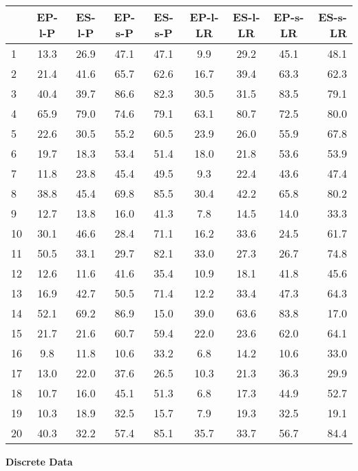 \documentclass[]{svjour3}
\begin{document}
\begin{table}[H]
\begin{center}
\begin{tabular}{l|c|c|c|c|c|c|c|r}
 & EP-l-P & ES-l-P & EP-s-P & ES-s-P & EP-l-LR & ES-l-LR & EP-s-LR & ES-s-LR \\
\hline
1 & 13.3 & 26.9 & 47.1 & 47.1 & 9.9 & 29.2 & 45.1 & 48.1 \\
2 & 21.4 & 41.6 & 65.7 & 62.6 & 16.7 & 39.4 & 63.3 & 62.3 \\
3 & 40.4 & 39.7 & 86.6 & 82.3 & 30.5 & 31.5 & 83.5 & 79.1 \\
4 & 65.9 & 79.0 & 74.6 & 79.1 & 63.1 & 80.7 & 72.5 & 80.0 \\
5 & 22.6 & 30.5 & 55.2 & 60.5 & 23.9 & 26.0 & 55.9 & 67.8 \\
6 & 19.7 & 18.3 & 53.4 & 51.4 & 18.0 & 21.8 & 53.6 & 53.9 \\
7 & 11.8 & 23.8 & 45.4 & 49.5 & 9.3 & 22.4 & 43.6 & 47.4 \\
8 & 38.8 & 45.4 & 69.8 & 85.5 & 30.4 & 42.2 & 65.8 & 80.2 \\
9 & 12.7 & 13.8 & 16.0 & 41.3 & 7.8 & 14.5 & 14.0 & 33.3 \\
10 & 30.1 & 46.6 & 28.4 & 71.1 & 16.2 & 33.6 & 24.5 & 61.7 \\
11 & 50.5 & 33.1 & 29.7 & 82.1 & 33.0 & 27.3 & 26.7 & 74.8 \\
12 & 12.6 & 11.6 & 41.6 & 35.4 & 10.9 & 18.1 & 41.8 & 45.6 \\
13 & 16.9 & 42.7 & 50.5 & 71.4 & 12.2 & 33.4 & 47.3 & 64.3 \\
14 & 52.1 & 69.2 & 86.9 & 15.0 & 39.0 & 63.6 & 83.8 & 17.0 \\
15 & 21.7 & 21.6 & 60.7 & 59.4 & 22.0 & 23.6 & 62.0 & 64.1 \\
16 & 9.8 & 11.8 & 10.6 & 33.2 & 6.8 & 14.2 & 10.6 & 33.0 \\
17 & 13.0 & 22.0 & 37.6 & 26.5 & 10.3 & 21.3 & 36.3 & 29.9 \\
18 & 10.7 & 16.0 & 45.1 & 51.3 & 6.8 & 17.3 & 44.9 & 52.7 \\
19 & 10.3 & 18.9 & 32.5 & 15.7 & 7.9 & 19.3 & 32.5 & 19.1 \\
20 & 40.3 & 32.2 & 57.4 & 85.1 & 35.7 & 33.7 & 56.7 & 84.4 \\
\end{tabular}
\end{center}
\end{table}



\textbf{Discrete Data}
\end{document}
